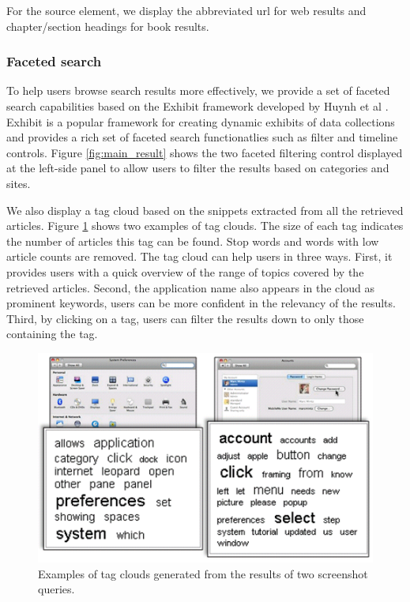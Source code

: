 \documentclass{www2010-submission}
\begin{document}
For the source element, we display the abbreviated url for web
results and chapter/section headings for book results.


\subsubsection{Faceted search}

To help users browse search results more effectively, we provide a set
of faceted search capabilities based on the Exhibit framework
developed by Huynh et al \cite{Huynh}. Exhibit is a popular framework for
creating dynamic exhibits of data collections and provides a rich set
of faceted search functionatlies such as filter and timeline
controls. Figure \ref{fig:main_result} shows the two faceted filtering
control displayed at the left-side panel to allow users to filter the results
based on categories and sites.

We also display a tag cloud based on the snippets extracted from all
the retrieved articles. Figure \ref{fig:tag_clouds} shows two examples
of tag clouds.  The size of each tag indicates the number of articles
this tag can be found.  Stop words and words with low article counts
are removed. The tag cloud can help users in three ways. First, it
provides users with a quick overview of the range of topics covered by the
retrieved articles.  Second, the application name also appears in the
cloud as prominent keywords, users can be more confident in the
relevancy of the results. Third, by clicking on a tag, users can
filter the results down to only those containing the tag.

\begin{figure}
\includegraphics[width=1\columnwidth]{figure/tag_clouds.png}
\caption{Examples of tag clouds generated from the 
results of two screenshot queries.}
\label{fig:tag_clouds}
\end{figure}
\end{document}
